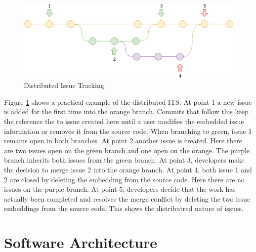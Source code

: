 \documentclass{mproj}
\begin{document}
\begin{figure}[t]
\caption{Distributed Issue Tracking}
\label{fig:distributed-issue-tracking}
\centering
\includegraphics[width=15cm]{distributed-issue-tracking}
\end{figure}

Figure \ref{fig:distributed-issue-tracking} shows a practical example of the distributed ITS. At point 1 a new issue is added for the first time into the orange branch. Commits that follow this keep the reference the to issue created here until a user modifies the embedded issue information or removes it from the source code. When branching to green, issue 1 remains open in both branches. At point 2 another issue is created. Here there are two issues open on the green branch and one open on the orange. The purple branch inherits both issues from the green branch. At point 3, developers make the decision to merge issue 2 into the orange branch. At point 4, both issue 1 and 2 are closed by deleting the embedding from the source code. Here there are no issues on the purple branch. At point 5, developers decide that the work has actually been completed and resolves the merge conflict by deleting the two issue embeddings from the source code. This shows the distributred nature of issues.







\section{Software Architecture}
\end{document}
